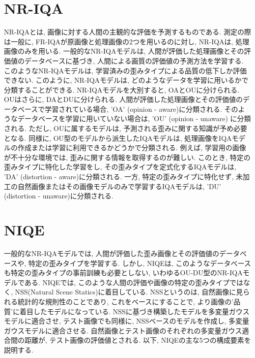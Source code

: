 \documentclass[a4paper,12pt]{jsreport}
\begin{document}
\section{NR-IQA}
NR-IQAとは, 画像に対する人間の主観的な評価を予測するものである. 測定の際は一般に, FR-IQAが原画像と処理画像の2つを用いるのに対し, NR-IQAは, 処理画像のみを用いる. 一般的なNR-IQAモデルは, 人間が評価した処理画像とその評価値のデータベースに基づき, 人間による画質の評価値の予測方法を学習する. このようなNR-IQAモデルは, 学習済みの歪みタイプによる品質の低下しか評価できない. このように, NR-IQAモデルは, どのようなデータを学習に用いるかで分類することができる. 
NR-IQAモデルを大別すると, OAとOUに分けられる. OUはさらに, DAとDUに分けられる.
人間が評価した処理画像とその評価値のデータベースで学習されている場合, 'OA' (opinion - aware)に分類される. そのようなデータベースを学習に用いていない場合は, 'OU' (opinion - unaware) に分類される. ただし, OUに属するモデルは, 予測される歪みに関する知識が予め必要となる. 同様に, OU型のモデルから派生したIQAモデルは, 処理画像をIQAモデルの作成または学習に利用できるかどうかで分類される. 例えば, 学習用の画像が不十分な環境では, 歪みに関する情報を取得するのが難しい. このとき, 特定の歪みタイプに特化した学習をし, その歪みタイプを定式化するIQAモデルは, 'DA' (distortion - aware)に分類される. 一方, 特定の歪みタイプに特化せず, 未加工の自然画像またはその画像モデルのみで学習するIQAモデルは, 'DU' (distortion - unaware)に分類される. 


\section{NIQE}
一般的なNR-IQAモデルでは, 人間が評価した歪み画像とその評価値のデータベースや, 特定の歪みタイプを学習する. しかし, NIQEは, このようなデータベースも特定の歪みタイプの事前訓練も必要としない, いわゆるOU-DU型のNR-IQAモデルである. NIQEでは, このような人間の評価や画像の特定の歪みタイプではなく, NSS(Natural Scene Statics)に着目している.
NSSというのは,  自然画像に見られる統計的な規則性のことであり, これをベースにすることで, より画像の'品質'に着目したモデルになっている. NSSに基づき構築したモデルを多変量ガウスモデルに適合させ, テスト画像でも同様に, NSSベースのモデルを作成し, 多変量ガウスモデルに適合させる. 自然画像とテスト画像のそれぞれの多変量ガウス適合間の距離が, テスト画像の評価値とされる. 
以下, NIQEの主な5つの構成要素を説明する. 
\end{document}
